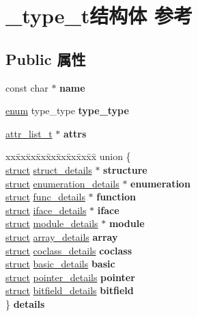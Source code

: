 \hypertarget{struct__type__t}{}\section{\+\_\+type\+\_\+t结构体 参考}
\label{struct__type__t}
\subsection*{Public 属性}
\begin{DoxyCompactItemize}
\item 
\mbox{\label{struct__type__t_aae28ce8d4d012a3ba3ff973b19013d50}} 
const char $\ast$ {\bfseries name}
\item 
\mbox{\label{struct__type__t_a648ddea48f669276872bc4142fc972e1}} 
\hyperlink{interfaceenum}{enum} type\+\_\+type {\bfseries type\+\_\+type}
\item 
\mbox{\label{struct__type__t_a153286651d86312299d8b6d03fdcc5e2}} 
\hyperlink{classlist}{attr\+\_\+list\+\_\+t} $\ast$ {\bfseries attrs}
\item 
\mbox{\label{struct__type__t_a0efea28e69de1a3775626f9abf0fae65}} 
\begin{tabbing}
xx\=xx\=xx\=xx\=xx\=xx\=xx\=xx\=xx\=\kill
union \{\\
\>\hyperlink{interfacestruct}{struct} \hyperlink{structstruct__details}{struct\_details} $\ast$ {\bfseries structure}\\
\>\hyperlink{interfacestruct}{struct} \hyperlink{structenumeration__details}{enumeration\_details} $\ast$ {\bfseries enumeration}\\
\>\hyperlink{interfacestruct}{struct} \hyperlink{structfunc__details}{func\_details} $\ast$ {\bfseries function}\\
\>\hyperlink{interfacestruct}{struct} \hyperlink{structiface__details}{iface\_details} $\ast$ {\bfseries iface}\\
\>\hyperlink{interfacestruct}{struct} \hyperlink{structmodule__details}{module\_details} $\ast$ {\bfseries module}\\
\>\hyperlink{interfacestruct}{struct} \hyperlink{structarray__details}{array\_details} {\bfseries array}\\
\>\hyperlink{interfacestruct}{struct} \hyperlink{structcoclass__details}{coclass\_details} {\bfseries coclass}\\
\>\hyperlink{interfacestruct}{struct} \hyperlink{structbasic__details}{basic\_details} {\bfseries basic}\\
\>\hyperlink{interfacestruct}{struct} \hyperlink{structpointer__details}{pointer\_details} {\bfseries pointer}\\
\>\hyperlink{interfacestruct}{struct} \hyperlink{structbitfield__details}{bitfield\_details} {\bfseries bitfield}\\
\} {\bfseries details}\\


\end{tabbing}
\end{DoxyCompactItemize}
